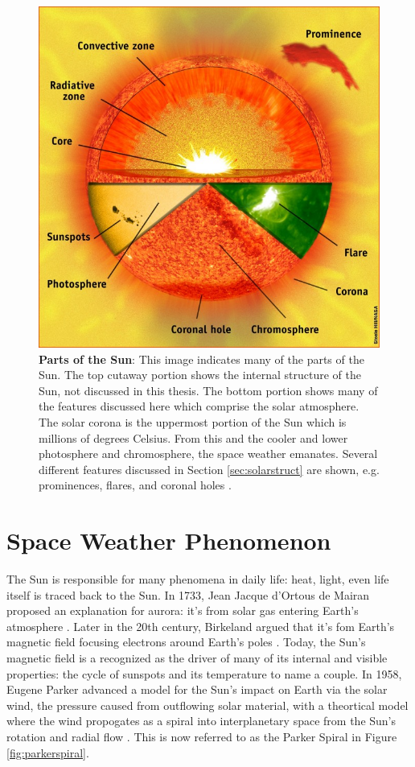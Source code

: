 \documentclass[twoside]{report}
\begin{document}
\begin{figure}[ht]
  \begin{center}
    \includegraphics[scale=0.4]{sunparts}
    \caption{{\bf Parts of the Sun}: This image indicates many of the parts of the Sun. The top cutaway portion shows the internal structure of the Sun, not discussed in this thesis. The bottom portion shows many of the features discussed here which comprise the solar atmosphere. The solar corona is the uppermost portion of the Sun which is millions of degrees Celsius. From this and the cooler and lower photosphere and chromosphere, the space weather emanates. Several different features discussed in Section \ref{sec:solarstruct} are shown, e.g. prominences, flares, and coronal holes \cite{sunparts}.}
    \label{fig:sunparts}
 \end{center}
\end{figure}


\section{Space Weather Phenomenon} \label{sec:space-weather-events}
The Sun is responsible for many phenomena in daily life: heat, light, even life itself is traced back to the Sun. In 1733, Jean Jacque d'Ortous de Mairan proposed an explanation for aurora: it's from solar gas entering Earth's atmosphere \cite[p. 51]{langbook}. Later in the 20th century, Birkeland argued that it's fom Earth's magnetic field focusing electrons around Earth's poles \cite[p. 51]{langbook}. Today, the Sun's magnetic field is a recognized as the driver of many of its internal and visible properties: the cycle of sunspots and its temperature to name a couple. In 1958, Eugene Parker advanced a model for the Sun's impact on Earth via the solar wind, the pressure caused from outflowing solar material, with a theortical model where the wind propogates as a spiral into interplanetary space from the Sun's rotation and radial flow \cite[p. 62]{langbook}. This is now referred to as the Parker Spiral in Figure \ref{fig:parkerspiral}. 
\end{document}
